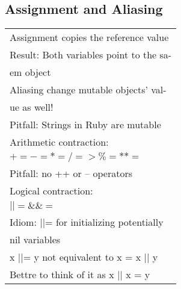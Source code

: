 \subsection*{Assignment and Aliasing}
\begin{tabular}{ l }
Assignment copies the reference value \\
\rowcolor{Gray}
Result: Both variables point to the sa- \\
\rowcolor{Gray}
em object \\
Aliasing change mutable objects' val-\\
ue as well! \\
\rowcolor{Gray}
Pitfall: Strings in Ruby are mutable \\
Arithmetic contraction: \\
$+=$\hspace{4mm}$-=$\hspace{4mm}$*=$\hspace{4mm}$/=$\hspace{4mm}$>\%=$\hspace{4mm}$**=$ \\
\rowcolor{Gray}
Pitfall: no ++ or -- operators \\
Logical contraction: \\
$| |=$\hspace{4mm}$\&\&=$ \\
\rowcolor{Gray}
Idiom: ||= for initializing potentially \\
nil variables \\
x ||= y not equivalent to x = x || y \\
\rowcolor{Gray}
Bettre to think of it as x || x = y \\
\end{tabular}
\\

